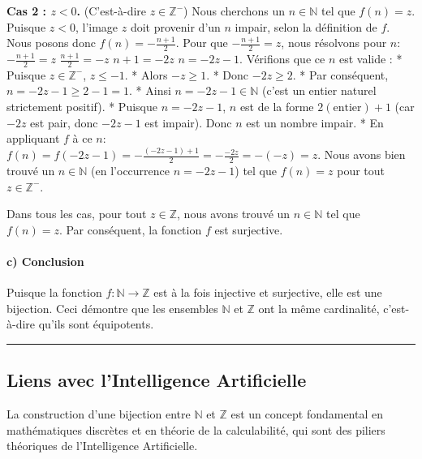 \documentclass[12pt,a4paper]{report}
\begin{document}
\textbf{Cas 2 : \(z < 0\).} (C'est-à-dire \(z \in \mathbb{Z}^-\)) Nous
cherchons un \(n \in \mathbb{N}\) tel que \(f(n) = z\). Puisque
\(z < 0\), l'image \(z\) doit provenir d'un \(n\) impair, selon la
définition de \(f\). Nous posons donc \(f(n) = -\frac{n+1}{2}\). Pour
que \(-\frac{n+1}{2} = z\), nous résolvons pour \(n\):
\(-\frac{n+1}{2} = z\) \(\frac{n+1}{2} = -z\) \(n+1 = -2z\)
\(n = -2z-1\). Vérifions que ce \(n\) est valide : * Puisque
\(z \in \mathbb{Z}^-\), \(z \le -1\). * Alors \(-z \ge 1\). * Donc
\(-2z \ge 2\). * Par conséquent, \(n = -2z-1 \ge 2-1 = 1\). * Ainsi
\(n = -2z-1 \in \mathbb{N}\) (c'est un entier naturel strictement
positif). * Puisque \(n = -2z-1\), \(n\) est de la forme
\(2(\text{entier})+1\) (car \(-2z\) est pair, donc \(-2z-1\) est
impair). Donc \(n\) est un nombre impair. * En appliquant \(f\) à ce
\(n\):
\(f(n) = f(-2z-1) = -\frac{(-2z-1)+1}{2} = -\frac{-2z}{2} = -(-z) = z\).
Nous avons bien trouvé un \(n \in \mathbb{N}\) (en l'occurrence
\(n=-2z-1\)) tel que \(f(n)=z\) pour tout \(z \in \mathbb{Z}^-\).

Dans tous les cas, pour tout \(z \in \mathbb{Z}\), nous avons trouvé un
\(n \in \mathbb{N}\) tel que \(f(n)=z\). Par conséquent, la fonction
\(f\) est surjective.

\paragraph{c) Conclusion}\label{c-conclusion}

Puisque la fonction \(f: \mathbb{N} \to \mathbb{Z}\) est à la fois
injective et surjective, elle est une bijection. Ceci démontre que les
ensembles \(\mathbb{N}\) et \(\mathbb{Z}\) ont la même cardinalité,
c'est-à-dire qu'ils sont équipotents.

\begin{center}\rule{0.5\linewidth}{0.5pt}\end{center}

\subsection{Liens avec l'Intelligence
Artificielle}\label{liens-avec-lintelligence-artificielle}

La construction d'une bijection entre \(\mathbb{N}\) et \(\mathbb{Z}\)
est un concept fondamental en mathématiques discrètes et en théorie de
la calculabilité, qui sont des piliers théoriques de l'Intelligence
Artificielle.
\end{document}
